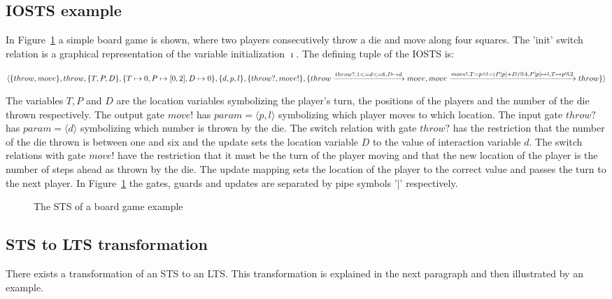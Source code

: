 \subsection{IOSTS example}\label{sec:sts_example}
In Figure~\ref{fig:example_sts} a simple board game is shown, where two players consecutively throw a die and move along four squares. The 'init' switch relation is a graphical representation of the variable initialization $\imath$. The defining tuple of the IOSTS is:

$\langle\{throw, move\},throw,\{T, P, D\},\{T \mapsto 0, P \mapsto [0, 2], D \mapsto 0\},\{d, p, l\},\{throw?, move!\},\\
\{throw\xrightarrow{throw?, 1 <= d <= 6, D \mapsto d}move, move\xrightarrow{move!, T=p \land l=(P[p]+D)\%4, P[p] \mapsto l, T \mapsto p\%2}throw\}\rangle$

The variables $T, P$ and $D$ are the location variables symbolizing the player's turn, the positions of the players and the number of the die thrown respectively. The output gate $move!$ has $param = \langle p, l\rangle$ symbolizing which player moves to which location. The input gate $throw?$ has $param = \langle d\rangle$ symbolizing which number is thrown by the die. The switch relation with gate $throw?$ has the restriction that the number of the die thrown is between one and six and the update sets the location variable $D$ to the value of interaction variable $d$. The switch relations with gate $move!$ have the restriction that it must be the turn of the player moving and that the new location of the player is the number of steps ahead as thrown by the die. The update mapping sets the location of the player to the correct value and passes the turn to the next player. In Figure~\ref{fig:example_sts} the gates, guards and updates are separated by pipe symbols '|' respectively.

\begin{figure}[h]
  \begin{center}
    
  \end{center}
  \caption{The STS of a board game example}
  \label{fig:example_sts}
\end{figure}

\subsection{STS to LTS transformation}\label{sec:sts_lts_trafo}
There exists a transformation of an STS to an LTS. This transformation is explained in the next paragraph and then illustrated by an example.

